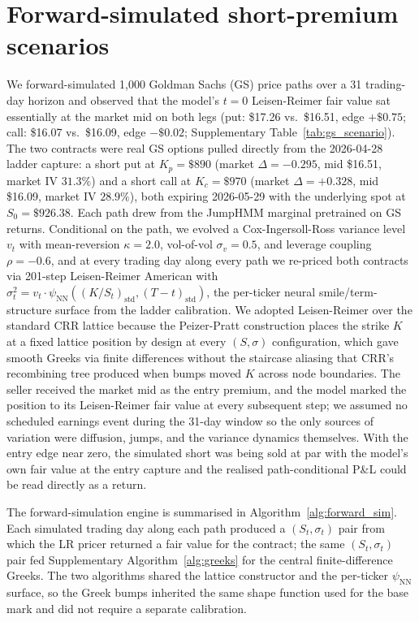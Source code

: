 \section{Forward-simulated short-premium scenarios}\label{sec:scenarios}

We forward-simulated 1{,}000 Goldman Sachs (GS) price paths over a 31 trading-day horizon and observed that the model's $t=0$ Leisen-Reimer fair value sat essentially at the market mid on both legs (put: \$17.26 vs.\ \$16.51, edge $+\$0.75$; call: \$16.07 vs.\ \$16.09, edge $-\$0.02$; Supplementary Table~\ref{tab:gs_scenario}). The two contracts were real GS options pulled directly from the 2026-04-28 ladder capture: a short put at $K_p = \$890$ (market $\Delta = -0.295$, mid \$16.51, market IV $31.3\%$) and a short call at $K_c = \$970$ (market $\Delta = +0.328$, mid \$16.09, market IV $28.9\%$), both expiring 2026-05-29 with the underlying spot at $S_0 = \$926.38$. Each path drew from the JumpHMM marginal pretrained on GS returns. Conditional on the path, we evolved a Cox-Ingersoll-Ross variance level $v_t$ with mean-reversion $\kappa = 2.0$, vol-of-vol $\sigma_v = 0.5$, and leverage coupling $\rho = -0.6$, and at every trading day along every path we re-priced both contracts via 201-step Leisen-Reimer American with $\sigma_t^2 = v_t \cdot \psi_{\mathrm{NN}}((K/S_t)_{\mathrm{std}}, (T-t)_{\mathrm{std}})$, the per-ticker neural smile/term-structure surface from the ladder calibration. We adopted Leisen-Reimer over the standard CRR lattice because the Peizer-Pratt construction places the strike $K$ at a fixed lattice position by design at every $(S, \sigma)$ configuration, which gave smooth Greeks via finite differences without the staircase aliasing that CRR's recombining tree produced when bumps moved $K$ across node boundaries. The seller received the market mid as the entry premium, and the model marked the position to its Leisen-Reimer fair value at every subsequent step; we assumed no scheduled earnings event during the 31-day window so the only sources of variation were diffusion, jumps, and the variance dynamics themselves. With the entry edge near zero, the simulated short was being sold at par with the model's own fair value at the entry capture and the realised path-conditional P\&L could be read directly as a return.

The forward-simulation engine is summarised in Algorithm~\ref{alg:forward_sim}. Each simulated trading day along each path produced a $(S_t, \sigma_t)$ pair from which the LR pricer returned a fair value for the contract; the same $(S_t, \sigma_t)$ pair fed Supplementary Algorithm~\ref{alg:greeks} for the central finite-difference Greeks. The two algorithms shared the lattice constructor and the per-ticker $\psi_{\mathrm{NN}}$ surface, so the Greek bumps inherited the same shape function used for the base mark and did not require a separate calibration.

